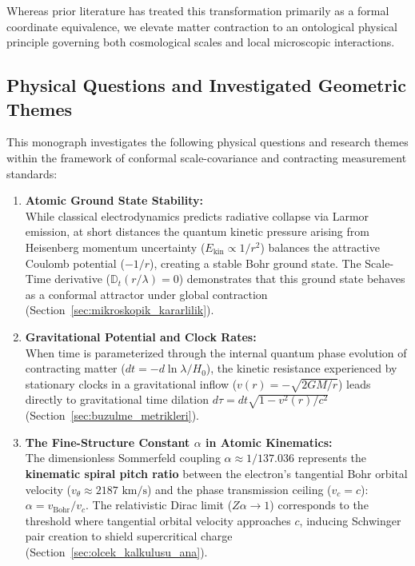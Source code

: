 Whereas prior literature has treated this transformation primarily as a formal coordinate equivalence, we elevate matter contraction to an ontological physical principle governing both cosmological scales and local microscopic interactions.

\subsection{Physical Questions and Investigated Geometric Themes}
\label{sec:temel_sorular}

This monograph investigates the following physical questions and research themes within the framework of conformal scale-covariance and contracting measurement standards:

\begin{enumerate}
      \item \textbf{Atomic Ground State Stability:} \\
            While classical electrodynamics predicts radiative collapse via Larmor emission, at short distances the quantum kinetic pressure arising from Heisenberg momentum uncertainty ($E_{\mathrm{kin}} \propto 1/r^2$) balances the attractive Coulomb potential ($-1/r$), creating a stable Bohr ground state. The Scale-Time derivative ($\mathbb{D}_t(r/\lambda) = 0$) demonstrates that this ground state behaves as a conformal attractor under global contraction (Section~\ref{sec:mikroskopik_kararlilik}).

      \item \textbf{Gravitational Potential and Clock Rates:} \\
            When time is parameterized through the internal quantum phase evolution of contracting matter ($dt = -d\ln\lambda/H_0$), the kinetic resistance experienced by stationary clocks in a gravitational inflow ($v(r) = -\sqrt{2GM/r}$) leads directly to gravitational time dilation $d\tau = dt\sqrt{1 - v^2(r)/c^2}$ (Section~\ref{sec:buzulme_metrikleri}).

      \item \textbf{The Fine-Structure Constant $\alpha$ in Atomic Kinematics:} \\
            The dimensionless Sommerfeld coupling $\alpha \approx 1/137.036$ represents the \textbf{kinematic spiral pitch ratio} between the electron's tangential Bohr orbital velocity ($v_\theta \approx 2187\text{ km/s}$) and the phase transmission ceiling ($v_c = c$): $\alpha = v_{\mathrm{Bohr}} / v_c$. The relativistic Dirac limit ($Z\alpha \to 1$) corresponds to the threshold where tangential orbital velocity approaches $c$, inducing Schwinger pair creation to shield supercritical charge (Section~\ref{sec:olcek_kalkulusu_ana}).


\end{enumerate}
